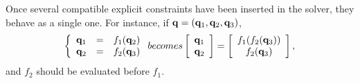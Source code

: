 Once several compatible explicit constraints have been inserted in the solver,
they behave as a single one. For instance, if $\mathbf{q}=(\mathbf{q}_1,\mathbf{q}_2,\mathbf{q}_3)$,
$$
  \left\{\begin{array}{lcl}\mathbf{q}_1 &=& f_1(\mathbf{q}_2)\\
  \mathbf{q}_2 &=& f_2(\mathbf{q}_3)\end{array}\right. \relax{ becomes }
  \left[\begin{array}{cc}\mathbf{q}_1\\ \mathbf{q}_2\end{array}\right] =
    \left[\begin{array}{cc}f_1(f_2(\mathbf{q}_3))\\ f_2(\mathbf{q}_3)\end{array}\right],
$$
and $f_2$ should be evaluated before $f_1$.

